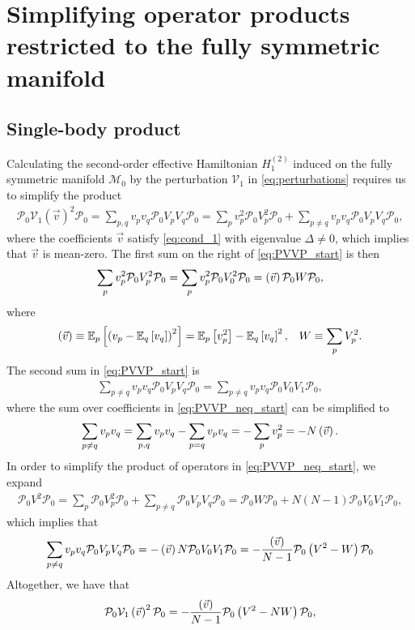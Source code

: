 \documentclass[nofootinbib,notitlepage,11pt]{revtex4-2}
\newcommand{\f}[2]{\dfrac{#1}{#2}} %
\newcommand{\p}[1]{\left(#1\right)} %
\renewcommand{\sp}[1]{\left[#1\right]} %
\renewcommand{\v}{\vec} %
\newcommand{\1}{\mathds{1}}
\newcommand{\M}{\mathcal{M}}
\renewcommand{\P}{\mathcal{P}}
\newcommand{\V}{\mathcal{V}}
\newcommand{\EE}{\mathbb{E}}
\let\var\relax
\DeclareMathOperator{\var}{var}
\begin{document}
\section{Simplifying operator products restricted to the fully
  symmetric manifold}
\label{sec:sym_prod}

\subsection{Single-body product}
\label{sec:PVVP}

Calculating the second-order effective Hamiltonian $H_1^{(2)}$ induced
on the fully symmetric manifold $\M_0$ by the perturbation $\V_1$ in
\eqref{eq:perturbations} requires us to simplify the product
\begin{align}
  \P_0 \V_1\p{\v v}^2 \P_0
  = \sum_{p,q} v_p v_q \P_0 V_p V_q \P_0
  = \sum_p v_p^2 \P_0 V_p^2 \P_0
  + \sum_{p\ne q} v_p v_q \P_0 V_p V_q \P_0,
  \label{eq:PVVP_start}
\end{align}
where the coefficients $\v v$ satisfy \eqref{eq:cond_1} with
eigenvalue $\Delta\ne0$, which implies that $\v v$ is mean-zero.  The
first sum on the right of \eqref{eq:PVVP_start} is then
\begin{align}
  \sum_p v_p^2 \P_0 V_p^2 \P_0
  = \sum_p v_p^2 \P_0 V_0^2 \P_0
  = \var\p{\v v} \P_0 W \P_0,
  \label{eq:PVVP_eq}
\end{align}
where
\begin{align}
  \var\p{\v v} \equiv \EE_p\sp{\p{v_p-\EE_q\sp{v_q}}^2}
  = \EE_p\sp{v_p^2} - \EE_q\sp{v_q}^2,
  &&
  W \equiv \sum_p V_p^2.
\end{align}
The second sum in \eqref{eq:PVVP_start} is
\begin{align}
  \sum_{p\ne q} v_p v_q \P_0 V_p V_q \P_0
  = \sum_{p\ne q} v_p v_q \P_0 V_0 V_1 \P_0,
  \label{eq:PVVP_neq_start}
\end{align}
where the sum over coefficients in \eqref{eq:PVVP_neq_start} can be
simplified to
\begin{align}
  \sum_{p\ne q} v_p v_q
  = \sum_{p,q} v_p v_q - \sum_{p=q} v_p v_q
  = - \sum_p v_p^2 = - N \var\p{\v v}.
\end{align}
In order to simplify the product of operators in
\eqref{eq:PVVP_neq_start}, we expand
\begin{align}
  \P_0 V^2 \P_0
  = \sum_p \P_0 V_p^2 \P_0
  + \sum_{p\ne q} \P_0 V_p V_q \P_0
  = \P_0 W \P_0 + N \p{N-1} \P_0 V_0 V_1 \P_0,
  \label{eq:PVVP_neq_ops}
\end{align}
which implies that
\begin{align}
  \sum_{p\ne q} v_p v_q \P_0 V_p V_q \P_0
  = - \var\p{\v v} N \P_0 V_0 V_1 \P_0
  = -\f{\var\p{\v v}}{N-1} \P_0 \p{V^2 - W} \P_0
  \label{eq:PVVP_neq}
\end{align}
Altogether, we have that
\begin{align}
  \P_0 \V_1\p{\v v}^2 \P_0
  = -\f{\var\p{\v v}}{N-1} \P_0 \p{V^2 - N W} \P_0,
\end{align}
\end{document}
